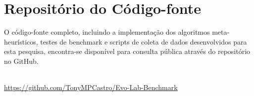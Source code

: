 \documentclass[12pt, a4paper, oneside]{report}
\begin{document}
\appendix
\chapter*{Repositório do Código-fonte}

O código-fonte completo, incluindo a implementação dos algoritmos meta-heurísticos, testes de benchmark e scripts de coleta de dados desenvolvidos para esta pesquisa, encontra-se disponível para consulta pública através do repositório no GitHub.

\begin{center}
     \\
    \vspace{0.5cm}
    \url{https://github.com/TonyMPCastro/Evo-Lab-Benchmark}
\end{center}

\end{document}
